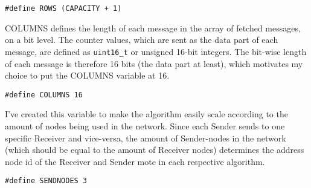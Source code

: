 \texttt{\#define ROWS (CAPACITY + 1)}

COLUMNS defines the length of each message in the array of fetched
messages, on a bit level. The counter values, which are sent as the data
part of each message, are defined as \texttt{uint16\_t} or unsigned
16-bit integers. The bit-wise length of each message is therefore 16
bits (the data part at least), which motivates my choice to put the
COLUMNS variable at 16.

\texttt{\#define COLUMNS 16}

I've created this variable to make the algorithm easily scale according
to the amount of nodes being used in the network. Since each Sender
sends to one specific Receiver and vice-versa, the amount of
Sender-nodes in the network (which should be equal to the amount of
Receiver nodes) determines the address node id of the Receiver and
Sender mote in each respective algorithm.

\texttt{\#define SENDNODES 3}
